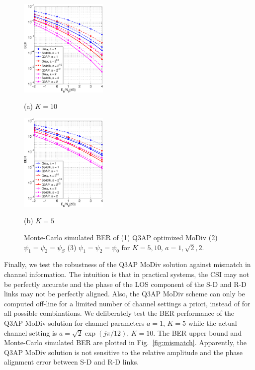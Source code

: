 \documentclass[journal]{IEEEtran}
\begin{document}
\begin{figure}[!t]
    \begin{minipage}[b]{0.49\linewidth}
      \centering
      \centerline{\includegraphics[width=4.2cm]{./figs/MC_10.eps}}
      \centerline{(a) $ K = 10$}\medskip
    \end{minipage}
    \hfill
    \begin{minipage}[b]{0.49\linewidth}
      \centering
      \centerline{\includegraphics[width=4.2cm]{./figs/MC_5.eps}}
      \centerline{(b) $K=5$}\medskip
    \end{minipage}
    \caption{Monte-Carlo simulated BER of (1) Q3AP optimized MoDiv
    (2) $\psi_1 = \psi_2 = \psi_S$ (3) $\psi_1 = \psi_2 = \psi_0$ for $K = 5,
    10$, $a = 1, \sqrt{2}, 2$.}
    \label{fig:montecarlo}
\end{figure}

Finally, we test the robustness of the Q3AP MoDiv solution against mismatch in
channel information. The intuition is that in practical systems, the CSI may not
be perfectly accurate and the phase of the LOS component of the S-D and R-D
links may not be perfectly aligned. Also, the Q3AP MoDiv scheme can only be
computed off-line for a limited number of channel settings a priori, instead of
for all possible combinations. We deliberately test the BER performance of the
Q3AP MoDiv solution for channel parameters $a=1$, $K=5$ while the actual channel
setting is $a = \sqrt{2}\exp(j\pi/12)$, $K = 10$. The BER upper bound and
Monte-Carlo simulated BER are plotted in Fig.~\ref{fig:mismatch}. Apparently,
the Q3AP MoDiv solution is not sensitive to the relative amplitude and the phase
alignment error between S-D and R-D links.
\end{document}
